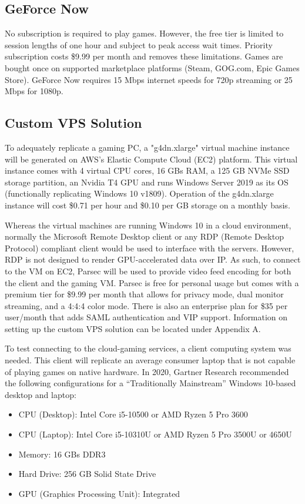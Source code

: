 \documentclass[titlepage, 12pt]{article}
\begin{document}
	\subsection{GeForce Now}
	
	No subscription is required to play games. However, the free tier is limited to session lengths of one hour and subject to peak access wait times. Priority subscription costs \$9.99 per month and removes these limitations. Games are bought once on supported marketplace platforms (Steam, GOG.com, Epic Games Store). GeForce Now requires 15 Mbps internet speeds for 720p streaming or 25 Mbps for 1080p.

	\subsection{Custom VPS Solution}
	
	To adequately replicate a gaming PC, a "g4dn.xlarge" virtual machine instance will be generated on AWS's Elastic Compute Cloud (EC2) platform. This virtual instance comes with 4 virtual CPU cores, 16 GBs RAM, a 125 GB NVMe SSD storage partition, an Nvidia T4 GPU and runs Windows Server 2019 as its OS (functionally replicating Windows 10 v1809). Operation of the g4dn.xlarge instance will cost \$0.71 per hour and \$0.10 per GB storage on a monthly basis.
	
	Whereas the virtual machines are running Windows 10 in a cloud environment, normally the Microsoft Remote Desktop client or any RDP (Remote Desktop Protocol) compliant client would be used to interface with the servers. However, RDP is not designed to render GPU-accelerated data over IP. As such, to connect to the VM on EC2, Parsec will be used to provide video feed encoding for both the client and the gaming VM. Parsec is free for personal usage but comes with a premium tier for \$9.99 per month that allows for privacy mode, dual monitor streaming, and a 4:4:4 color mode. There is also an enterprise plan for \$35 per user/month that adds SAML authentication and VIP support. Information on setting up the custom VPS solution can be located under Appendix A.
	
	To test connecting to the cloud-gaming services, a client computing system was needed. This client will replicate an average consumer laptop that is not capable of playing games on native hardware. In 2020, Gartner Research recommended the following configurations for a “Traditionally Mainstream” Windows 10-based desktop and laptop:

	\begin{itemize}
	\item {CPU (Desktop): Intel Core i5-10500 or AMD Ryzen 5 Pro 3600}
	\item {CPU (Laptop): Intel Core i5-10310U or AMD Ryzen 5 Pro 3500U or 4650U}
	\item {Memory: 16 GBs DDR3}
	\item {Hard Drive: 256 GB Solid State Drive}
	\item {GPU (Graphics Processing Unit): Integrated}
	\end{itemize}
\end{document}
